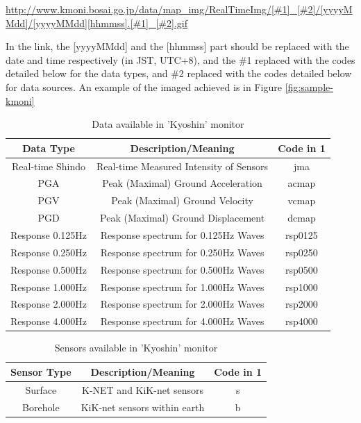 \documentclass[10pt]{article}
\begin{document}
\begin{center}
    \url{http://www.kmoni.bosai.go.jp/data/map_img/RealTimeImg/[#1]_[#2]/[yyyyMMdd]/[yyyyMMdd][hhmmss].[#1]_[#2].gif}
\end{center}

In the link, the [yyyyMMdd] and the [hhmmss] part should be replaced with the date and time respectively (in JST, UTC+8), and the \#1 replaced with the codes detailed below for the data types, and \#2 replaced with the codes detailed below for data sources. An example of the imaged achieved is in Figure \ref{fig:sample-kmoni}

\begin{table}[!ht]
    \centering

    \begin{tabular}{|c|c|c|}
        \hline
        Data Type        & Description/Meaning                     & Code in \@1 \\
        \hline
        Real-time Shindo & Real-time Measured Intensity of Sensors & jma         \\
        PGA              & Peak (Maximal) Ground Acceleration      & acmap       \\
        PGV              & Peak (Maximal) Ground Velocity          & vcmap       \\
        PGD              & Peak (Maximal) Ground Displacement      & dcmap       \\
        Response 0.125Hz & Response spectrum for 0.125Hz Waves     & rsp0125     \\
        Response 0.250Hz & Response spectrum for 0.250Hz Waves     & rsp0250     \\
        Response 0.500Hz & Response spectrum for 0.500Hz Waves     & rsp0500     \\
        Response 1.000Hz & Response spectrum for 1.000Hz Waves     & rsp1000     \\
        Response 2.000Hz & Response spectrum for 2.000Hz Waves     & rsp2000     \\
        Response 4.000Hz & Response spectrum for 4.000Hz Waves     & rsp4000     \\
        \hline
    \end{tabular}
    \caption{Data available in 'Kyoshin' monitor}
    \label{table:kmoni-data-types}
\end{table}

\begin{table}[!ht]
    \centering

    \begin{tabular}{|c|c|c|}
        \hline
        Sensor Type & Description/Meaning          & Code in \@1 \\
        \hline
        Surface     & K-NET and KiK-net sensors    & s           \\
        Borehole    & KiK-net sensors within earth & b           \\
        \hline
    \end{tabular}
    \caption{Sensors available in 'Kyoshin' monitor}
    \label{table:kmoni-sensor-types}
\end{table}
\end{document}
